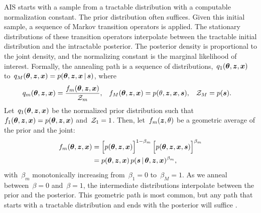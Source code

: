 \sloppy
AIS starts with a sample from a tractable distribution with a computable
normalization constant. The prior distribution often suffices.  Given this 
initial sample, a sequence of Markov transition operators is applied.
The stationary distributions of these transition operators interpolate
between the tractable initial distribution and the intractable posterior.
The posterior density is proportional to the joint density, and the normalizing 
constant is the marginal likelihood of interest.
Formally,  the annealing path is a sequence of
distributions,~${q_1(\boldsymbol{\theta}, \boldsymbol{z}, \boldsymbol{x})}$ 
to~${q_M(\boldsymbol{\theta}, \boldsymbol{z}, \boldsymbol{x}) = p(\boldsymbol{\theta}, \boldsymbol{z}, \boldsymbol{x} \,|\, \boldsymbol{s})}$,
where
\begin{align*}
q_m(\boldsymbol{\theta}, \boldsymbol{z}, \boldsymbol{x}) &= \frac{f_m(\boldsymbol{\theta}, \boldsymbol{z}, \boldsymbol{x})}{\mathcal{Z}_m}, & 
f_M(\boldsymbol{\theta}, \boldsymbol{z}, \boldsymbol{x}) &= p(\theta, \boldsymbol{z}, \boldsymbol{x}, \boldsymbol{s}), & 
\mathcal{Z}_M &= p(\boldsymbol{s}).
\end{align*}
Let~$q_1(\boldsymbol{\theta}, \boldsymbol{z}, \boldsymbol{x})$ be the normalized prior
distribution such
that~${f_1(\boldsymbol{\theta}, \boldsymbol{z}, \boldsymbol{x}) = p(\boldsymbol{\theta}, \boldsymbol{z}, \boldsymbol{x})}$
and~${\mathcal{Z}_1=1}$. Then, let~$f_m(\boldsymbol{z}, \theta)$ be a geometric
average of the prior and the joint:
\begin{align*}
  f_m(\boldsymbol{\theta}, \boldsymbol{z}, \boldsymbol{x}) 
  &=
  \Big[ p(\boldsymbol{\theta}, \boldsymbol{z}, \boldsymbol{x}) \Big]^{1-\beta_m} \,
  \Big[ p(\boldsymbol{\theta}, \boldsymbol{z}, \boldsymbol{x}, \boldsymbol{s}) \Big]^{\beta_m} \\
  &= p(\boldsymbol{\theta}, \boldsymbol{z}, \boldsymbol{x}) \, p(\boldsymbol{s} \,|\, \boldsymbol{\theta}, \boldsymbol{z}, \boldsymbol{x})^{\beta_m},
\end{align*}
with~$\beta_m$ monotonically increasing from~${\beta_1=0}$
to~${\beta_M=1}$.  As we anneal between~${\beta=0}$ and~${\beta=1}$,
the intermediate distributions interpolate between the prior and the
posterior.  This geometric path is most common, but any path that
starts with a tractable distribution and ends with the posterior will
suffice \citep[e.g.][]{grosse2013annealing}.



